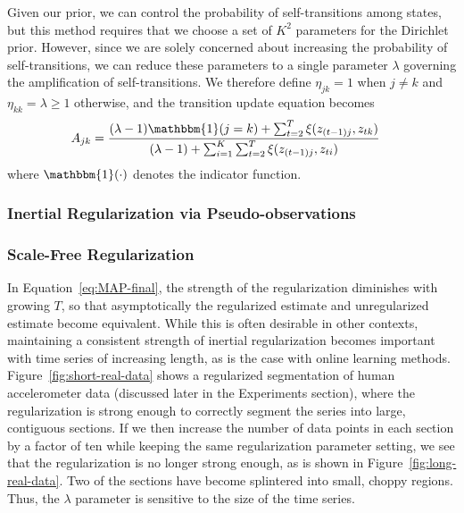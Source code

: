 \documentclass[12pt]{article}
\begin{document}
Given our prior, we can control the probability of self-transitions among states, but this method requires that we choose a set of $K^2$ parameters for the Dirichlet prior. However, since we are solely concerned about increasing the probability of self-transitions, we can reduce these parameters to a single parameter $\lambda$ governing the amplification of self-transitions. We therefore define $\eta_{jk} = 1$ when $j\not=k$ and $\eta_{kk}= \lambda \geq 1$ otherwise, and the transition update equation becomes
\begin{align}\label{eq:MAP-final}
    A_{jk} &= \frac{(\lambda - 1){\mathbbm{1}(j = k)} + \sum_{t=2}^{T} \xi(z_{(t-1)j}, z_{tk})}   
    {(\lambda - 1) + \sum_{i=1}^{K}\sum_{t=2}^{T} \xi(z_{(t-1)j}, z_{ti})}
\end{align}
where $\mathbbm{1}(\cdot)$ denotes the indicator function.

\subsubsection{Inertial Regularization via Pseudo-observations}



\subsubsection{Scale-Free Regularization}

In Equation~\ref{eq:MAP-final}, the strength of the regularization diminishes with growing $T$, so that asymptotically the regularized estimate and unregularized estimate become equivalent. While this is often desirable in other contexts, maintaining a consistent strength of inertial regularization becomes important with time series of increasing length, as is the case with online learning methods. Figure~\ref{fig:short-real-data} shows a regularized segmentation of human accelerometer data (discussed later in the Experiments section), where the regularization is strong enough to correctly segment the series into large, contiguous sections. If we then increase the number of data points in each section by a factor of ten while keeping the same regularization parameter setting, we see that the regularization is no longer strong enough, as is shown in Figure~\ref{fig:long-real-data}. Two of the sections have become splintered into small, choppy regions. Thus, the $\lambda$ parameter is sensitive to the size of the time series.
\end{document}
